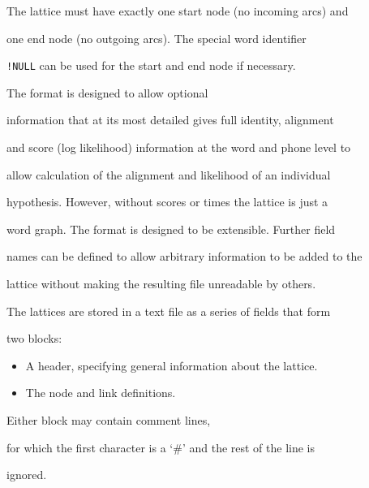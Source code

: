 The lattice must have exactly one start node (no incoming arcs) and


one end node (no outgoing arcs). The special word identifier


\verb|!NULL| can be used for the start and end node if necessary.










The format is designed to allow optional


information that at its most detailed gives full identity, alignment


and score (log likelihood) information at the word and phone level to


allow calculation of the alignment and likelihood of an individual


hypothesis. However, without scores or times the lattice is just a


word graph. The format is designed to be extensible.  Further field


names can be defined to allow arbitrary information to be added to the


lattice without making the resulting file unreadable by others.





The lattices are stored in a text file as a series of fields that form


two blocks:





\begin{itemize}


\item   A header, specifying general information about the lattice.


\item   The node and link definitions.


\end{itemize}





Either block may contain comment lines,


for which the first character is a `\#' and the rest of the line is


ignored.





